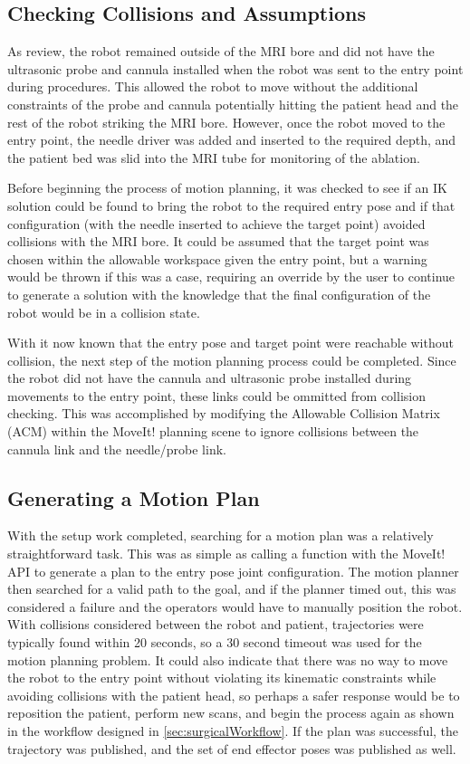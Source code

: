 \documentclass[12pt]{report}
\begin{document}
\subsection{Checking Collisions and Assumptions}
As review, the robot remained outside of the MRI bore and did not have the ultrasonic probe and cannula installed when the robot was sent to the entry point during procedures. This allowed the robot to move without the additional constraints of the probe and cannula potentially hitting the patient head and the rest of the robot striking the MRI bore. However, once the robot moved to the entry point, the needle driver was added and inserted to the required depth, and the patient bed was slid into the MRI tube for monitoring of the ablation. 

Before beginning the process of motion planning, it was checked to see if an IK solution could be found to bring the robot to the required entry pose and if that configuration (with the needle inserted to achieve the target point) avoided collisions with the MRI bore. It could be assumed that the target point was chosen within the allowable workspace given the entry point, but a warning would be thrown if this was a case, requiring an override by the user to continue to generate a solution with the knowledge that the final configuration of the robot would be in a collision state.

With it now known that the entry pose and target point were reachable without collision, the next step of the motion planning process could be completed. Since the robot did not have the cannula and ultrasonic probe installed during movements to the entry point, these links could be ommitted from collision checking. This was accomplished by modifying the Allowable Collision Matrix (ACM) within the MoveIt! planning scene to ignore collisions between the cannula link and the needle/probe link. 

\subsection{Generating a Motion Plan}
With the setup work completed, searching for a motion plan was a relatively straightforward task. This was as simple as calling a function with the MoveIt! API to generate a plan to the entry pose joint configuration. The motion planner then searched for a valid path to the goal, and if the planner timed out, this was considered a failure and the operators would have to manually position the robot. With collisions considered between the robot and patient, trajectories were typically found within 20 seconds, so a 30 second timeout was used for the motion planning problem. It could also indicate that there was no way to move the robot to the entry point without violating its kinematic constraints while avoiding collisions with the patient head, so perhaps a safer response would be to reposition the patient, perform new scans, and begin the process again as shown in the workflow designed in \autoref{sec:surgicalWorkflow}. If the plan was successful, the trajectory was published, and the set of end effector poses was published as well.
\end{document}
